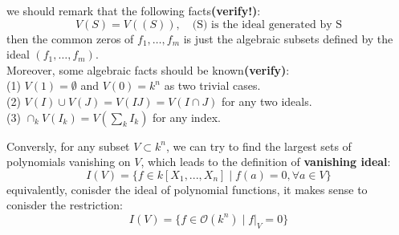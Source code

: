 \documentclass[12pt,a4paper]{article}
\begin{document}
\begin{remark} \label{varietymakestop}
    we should remark that the following facts\textbf{(verify!)}: \\
\[V(S) = V((S)), \quad \text{(S) is the ideal generated by S}\]
then the common zeros of \(f_1,\dots,f_m\) is just the algebraic subsets defined by the ideal \((f_1,\dots,f_m)\).\\

Moreover, some algebraic facts should be known\textbf{(verify)}:\\

(1) \(V(1) = \emptyset\) and \(V(0) = k^n\) as two trivial cases.\\

(2) \(V(I)\cup V(J) = V(IJ) = V(I \cap J)\) for any two ideals.\\

(3) \(\cap_{k}V(I_k) = V(\sum_k I_k)\) for any index.
\end{remark}


Conversly, for any subset \(V \subset k^n\), we can try to find the largest sets of polynomials vanishing on \(V\), which leads to the definition of \textbf{vanishing ideal}:
\[I(V) = \{f \in k[X_1,...,X_n] \mid f(a) = 0,  \forall a \in V\}\]
equivalently, conisder the ideal of polynomial functions, it makes sense to conisder the restriction:
\[I(V) = \{f \in \mathcal{O}(k^n) \mid f|_V = 0\}\]
\end{document}
